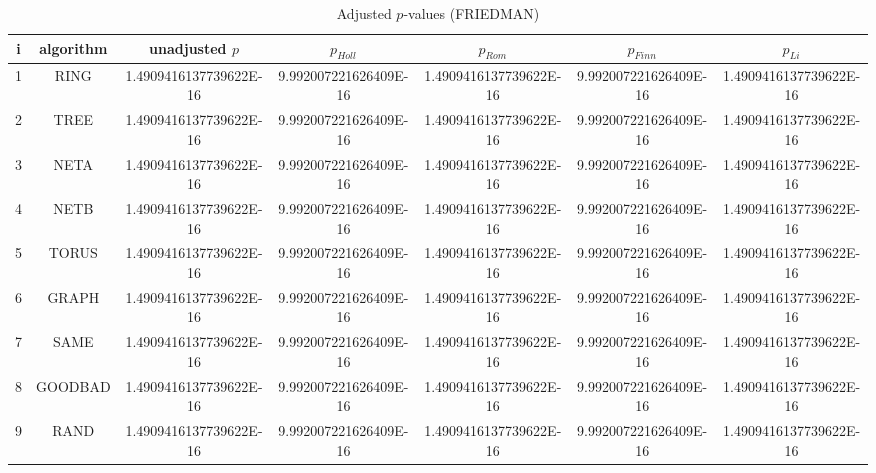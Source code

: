 \documentclass[a4paper,10pt]{article}
\begin{document}
\begin{landscape}
\begin{table}[!htp]
\centering\scriptsize
\caption{Adjusted $p$-values (FRIEDMAN)}
\begin{tabular}{ccccccc}
i&algorithm&unadjusted $p$&$p_{Holl}$&$p_{Rom}$&$p_{Finn}$&$p_{Li}$\\
\hline
1& RING&1.4909416137739622E-16&9.992007221626409E-16&1.4909416137739622E-16&9.992007221626409E-16&1.4909416137739622E-16\\
2& TREE&1.4909416137739622E-16&9.992007221626409E-16&1.4909416137739622E-16&9.992007221626409E-16&1.4909416137739622E-16\\
3& NETA&1.4909416137739622E-16&9.992007221626409E-16&1.4909416137739622E-16&9.992007221626409E-16&1.4909416137739622E-16\\
4& NETB&1.4909416137739622E-16&9.992007221626409E-16&1.4909416137739622E-16&9.992007221626409E-16&1.4909416137739622E-16\\
5& TORUS&1.4909416137739622E-16&9.992007221626409E-16&1.4909416137739622E-16&9.992007221626409E-16&1.4909416137739622E-16\\
6& GRAPH&1.4909416137739622E-16&9.992007221626409E-16&1.4909416137739622E-16&9.992007221626409E-16&1.4909416137739622E-16\\
7& SAME&1.4909416137739622E-16&9.992007221626409E-16&1.4909416137739622E-16&9.992007221626409E-16&1.4909416137739622E-16\\
8& GOODBAD&1.4909416137739622E-16&9.992007221626409E-16&1.4909416137739622E-16&9.992007221626409E-16&1.4909416137739622E-16\\
9& RAND&1.4909416137739622E-16&9.992007221626409E-16&1.4909416137739622E-16&9.992007221626409E-16&1.4909416137739622E-16\\
\hline
\end{tabular}
\end{table}


\newpage


\end{landscape}
\end{document}
